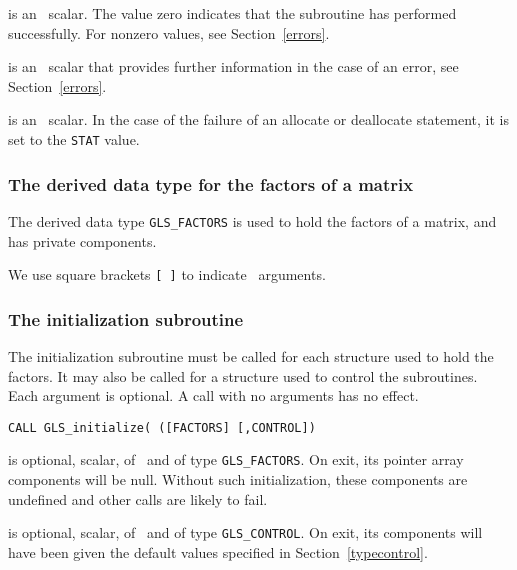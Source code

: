 \documentclass{galahad}
\newcommand{\packagename}{GLS}
\begin{document}
\begin{description}

 is an \integer\ scalar. The value
 zero indicates that the subroutine has performed
 successfully.  For nonzero values, see Section~\ref{errors}.

 is an \integer\ scalar that provides further information in the
case of an error, see Section~\ref{errors}.

 is an \integer\ scalar. In the case of the failure of an
allocate or deallocate statement, it is set to the {\tt STAT} value.

\end{description}


\subsubsection{The derived data type for the factors of a matrix}
The derived data type 
{\tt \packagename\_FACTORS} 
is used to hold the factors of a matrix, and has private components.


\galarguments
We use square brackets {\tt [ ]} to indicate \optional\ arguments.


\subsubsection{The initialization subroutine}\label{subinit}
The initialization subroutine must be called for each structure used
to hold the factors. It may also be called for a structure used to
control the subroutines. Each argument is optional. A call with no
arguments has no effect.
\vspace*{1mm}

\hspace{8mm}
{\tt CALL \packagename\_initialize( ([FACTORS] [,CONTROL])}

\begin{description}

 is optional, scalar, of \intentout\ and of type
{\tt \packagename\_FACTORS}. On exit, its pointer array components will be null. 
Without such initialization, these components
are undefined and other calls are likely to fail.

 is optional, scalar, of \intentout\ and of type
{\tt \packagename\_CONTROL}. On exit, its components will have been
given the default values specified in
Section~\ref{typecontrol}.

\end{description}
\end{document}

